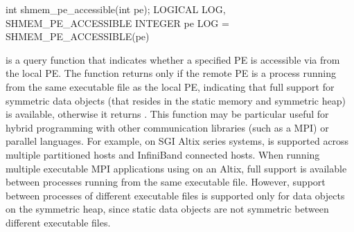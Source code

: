 \synC     
int shmem_pe_accessible(int pe); %
\synF
LOGICAL LOG, SHMEM_PE_ACCESSIBLE
INTEGER pe
LOG = SHMEM_PE_ACCESSIBLE(pe) %

{
        is  a  query function  that indicates  whether  a
       specified \ac{PE} is accessible via \openshmem from the local \ac{PE}. The  function returns
        only if  the  remote  \ac{PE}  is  a  process  running  from  the  same
       executable  file	as  the  local \ac{PE}, indicating that full \openshmem support for symmetric data objects
       (that resides in the static memory and symmetric heap) is available, otherwise it returns .
       This function may be particular useful for hybrid programming with 
       other communication libraries (such as a \ac{MPI}) or parallel languages. 
       For example, on  SGI Altix  series  systems, \openshmem is  supported  across multiple
       partitioned hosts and InfiniBand connected hosts. When running multiple executable MPI applications using \openshmem on an Altix,
       full \openshmem support is available between processes running from the same
       executable file. However, \openshmem support between processes of different
       executable  files  is  supported only for data objects on the symmetric
       heap, since static data objects are  not symmetric  between  different
       executable  files.        
}
{

}

\eAPI
